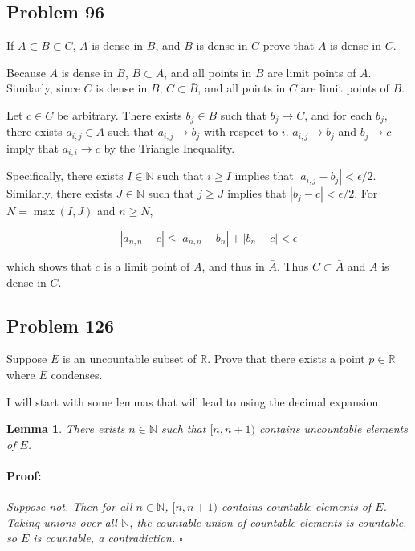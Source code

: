 \documentclass{article}
\newenvironment{proof}{\paragraph{Proof:}}{\hfill$\square$}
\newtheorem{lemma}[theorem]{Lemma}
\newcommand{\N}{\mathbb{N}}
\newcommand{\R}{\mathbb{R}}
\begin{document}
\subsection*{Problem 96}

If $A \subset B \subset C$, $A$ is dense in $B$, and $B$ is dense in $C$ prove that $A$ is dense in $C$.

Because $A$ is dense in $B$, $B \subset \bar{A}$, and all points in $B$ are limit points of $A$. Similarly, since $C$ is dense in $B$, $C \subset \bar{B}$, and all points in $C$ are limit points of $B$.

Let $c \in C$ be arbitrary. There exists $b_j \in B$ such that $b_j \rightarrow C$, and for each $b_j$, there exists $a_{i, j} \in A$ such that $a_{i, j} \rightarrow b_j$ with respect to $i$. $a_{i, j} \rightarrow b_j$ and $b_j \rightarrow c$ imply that $a_{i, i} \rightarrow c$ by the Triangle Inequality. 

Specifically, there exists $I \in \N$ such that $i \geq I$ implies that $|a_{i,j} - b_{j}| < \epsilon/2$. Similarly, there exists $J \in \N$ such that $j \geq J$ implies that $|b_j - c| < \epsilon/2$. For $N = \max(I, J)$ and $n \geq N$,

\[
|a_{n,n} - c| \leq |a_{n, n} - b_n| + |b_n - c| < \epsilon
\]

which shows that $c$ is a limit point of $A$, and thus in $\bar{A}$. Thus $C \subset \bar{A}$ and $A$ is dense in $C$.

\subsection*{Problem 126}

Suppose $E$ is an uncountable subset of $\R$. Prove that there exists a point $p \in \R$ where $E$ condenses.

I will start with some lemmas that will lead to using the decimal expansion.

\begin{lemma}
There exists $n \in \N$ such that $[n, n+1)$ contains uncountable elements of $E$.
\begin{proof}
Suppose not. Then for all $n \in \N$, $[n, n+1)$ contains countable elements of $E$. Taking unions over all $\N$, the countable union of countable elements is countable, so $E$ is countable, a contradiction.
\end{proof}
\end{lemma}
\end{document}
